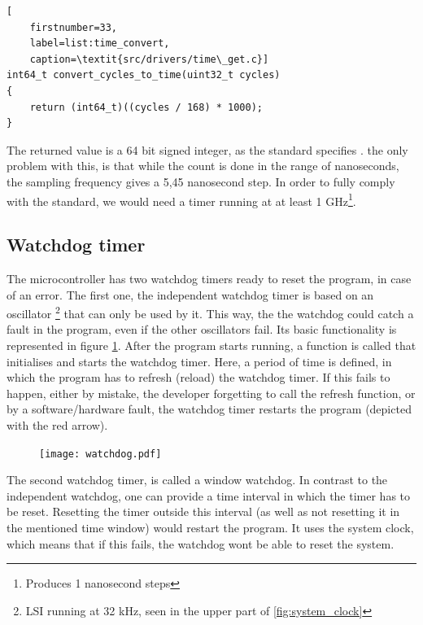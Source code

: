 \begin{minipage}{\linewidth}
\begin{lstlisting}[
	firstnumber=33,
	label=list:time_convert,
	caption=\textit{src/drivers/time\_get.c}]
int64_t convert_cycles_to_time(uint32_t cycles)
{
    return (int64_t)((cycles / 168) * 1000);
}
\end{lstlisting}
\end{minipage}

The returned value is a 64 bit signed integer, as the \arinc{} standard 
specifies \cite{arinc_time}. the only problem with this, is that while 
the count is done in the range of nanoseconds, the sampling frequency
gives a 5,45 nanosecond step. In order to fully comply with the standard,
we would need a timer running at at least 1 GHz\footnote{Produces 1
 nanosecond steps}.

\subsection{Watchdog timer}
The microcontroller has two watchdog timers ready to reset the program, in case of an error.
The first one, the independent watchdog timer is based on an oscillator
\footnote{LSI running at 32 kHz, seen in the upper part of
 \ref{fig:system_clock}}
that can only be used by it. This way,
the the watchdog could catch a fault in the program, even if the other
oscillators fail. Its basic functionality is represented in figure
\ref{fig:watchdog}. After the program starts running, a function is called
that initialises and starts the watchdog timer. Here, a period of time is defined, in which the program has to refresh (reload) the watchdog timer.
If this fails to happen, either by mistake, the developer forgetting to 
call the refresh function, or by a software/hardware fault, the watchdog 
timer restarts the program (depicted with the red arrow).

\begin{figure}[H]
\centering
\texttt{[image: watchdog.pdf]}
\label{fig:watchdog}
\end{figure}


The second watchdog timer, is called a window watchdog. In contrast 
to the independent watchdog, one can provide a time interval in which
the timer has to be reset. Resetting the timer outside this interval
(as well as not resetting it in the mentioned time window) would restart
the program. It uses the system clock, which means that if this fails,
the watchdog won\textquotesingle t be able to reset the system.

